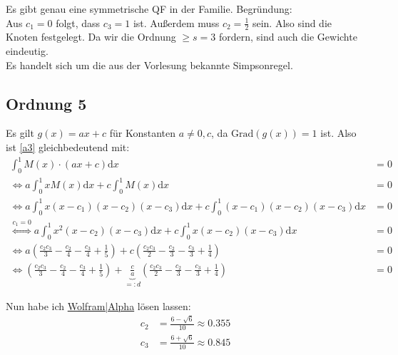 Es gibt genau eine symmetrische QF in der Familie. Begründung: \\
Aus $c_1 = 0 $ folgt, dass $c_3 = 1$ ist. Außerdem muss $c_2 = \frac{1}{2} $ sein. Also sind die Knoten festgelegt. Da wir die Ordnung $\ge s = 3$ fordern, sind auch die Gewichte eindeutig. \\
Es handelt sich um die aus der Vorlesung bekannte Simpsonregel.

\subsection*{Ordnung 5}
Es gilt $g(x) = ax+c$ für Konstanten $a \neq 0, c$, da $\text{Grad}(g(x))=1$ ist. 
Also ist \ref{a3} gleichbedeutend mit:
\begin{align}
	 \int_0^1 M(x) \cdot (ax+c) \mathrm{d}x &= 0 \\
    \Leftrightarrow a \int_0^1 x M(x) \mathrm{d}x + c \int_0^1 M(x) \mathrm{d}x &= 0 \\
    \Leftrightarrow a \int_0^1 x (x-c_1)(x-c_2)(x-c_3) \mathrm{d}x + c \int_0^1 (x-c_1)(x-c_2)(x-c_3) \mathrm{d}x &= 0 \\
    \stackrel{c_1=0}{\Leftrightarrow} a \int_0^1 x^2(x-c_2)(x-c_3) \mathrm{d}x + c \int_0^1 x(x-c_2)(x-c_3) \mathrm{d}x &= 0 \\
    \Leftrightarrow a \left (\frac{c_2 c_3}{3}-\frac{c_2}{4}-\frac{c_3}{4}+\frac{1}{5} \right ) + c \left ( \frac{c_2 c_3}{2}-\frac{c_2}{3}-\frac{c_3}{3}+\frac{1}{4} \right ) &= 0 \\
    \Leftrightarrow \left (\frac{c_2 c_3}{3}-\frac{c_2}{4}-\frac{c_3}{4}+\frac{1}{5} \right ) + \underbrace{\frac{c}{a}}_{=: d} \left ( \frac{c_2 c_3}{2}-\frac{c_2}{3}-\frac{c_3}{3}+\frac{1}{4} \right ) &= 0
\end{align}

Nun habe ich \href{http://www.wolframalpha.com/input/?i=(1%2F5+-+c%2F4+%2B+(b+(-3+%2B+4+c))%2F12)%2B+d*(3+-+4+c+%2B+b+(-4+%2B+6+c))%2F12%3D0}{Wolfram|Alpha} lösen lassen:
\begin{align}
    c_2 &= \frac{6-\sqrt{6}}{10} \approx 0.355\\
    c_3 &= \frac{6+\sqrt{6}}{10} \approx 0.845
\end{align}

